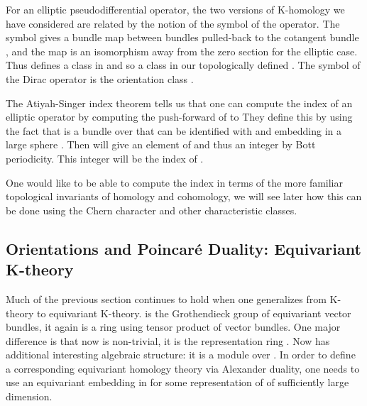 \documentclass[a4paper,a4paper]{article}
\theoremstyle{conjecture}
\begin{document}
For \coordHE{} an elliptic pseudodifferential operator, the two versions of 
K-homology we have considered are related by the notion of the symbol
\coordHE{} of the operator.  The symbol gives a bundle map between
bundles pulled-back to the cotangent bundle \coordHE{}, and the map is
an isomorphism away from the zero section for the elliptic case. Thus
\coordHE{} defines a class in \coordHE{} and so a class in our
topologically defined \coordHE{}.  The symbol of the Dirac operator is the 
orientation class \coordHE{}.  

The Atiyah-Singer index theorem tells us that one can compute the index of
an elliptic operator \coordHE{} by computing the push-forward of 
\coordHE{} to \coordHE{}
They define this by using the fact that \coordHE{} is a bundle over \coordHE{} that
can be identified with \coordHE{} and embedding \coordHE{}
in a large sphere \coordHE{}. Then 
\coordHE{} will give an element of \coordHE{} and thus
an integer by Bott periodicity. This integer will be the index of \coordHE{}.

One would like to be able to compute the index in terms of the more
familiar topological invariants of homology and cohomology, we will see later
how this can be done using the Chern character and other characteristic
classes.

\subsection {Orientations and Poincar\'e Duality: Equivariant K-theory}

Much of the previous section continues to hold when one generalizes from K-theory to equivariant K-theory.  
\coordHE{} is the Grothendieck group of equivariant vector bundles, it again is a ring using tensor product of
vector bundles.  One major difference is that now \coordHE{} is non-trivial, it is the representation ring
\coordHE{}.  Now \coordHE{} has additional interesting algebraic structure: it is a module over \coordHE{}.
In order to define a corresponding equivariant homology theory via Alexander duality, one needs to use
an equivariant embedding in \coordHE{} for \coordHE{} some representation of \coordHE{} of sufficiently large dimension.
\end{document}
